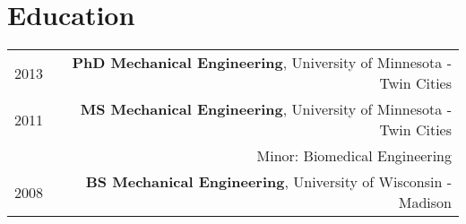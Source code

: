 \section*{Education}
\begin{tabular}{L!{\VRule}R}
2013&{\bf PhD Mechanical Engineering}, University of Minnesota - Twin Cities\\
2011&{\bf MS Mechanical Engineering}, University of Minnesota - Twin Cities\\
& \hspace{5 mm} Minor: Biomedical Engineering \\
2008&{\bf BS Mechanical Engineering}, University of Wisconsin - Madison\\
\end{tabular}